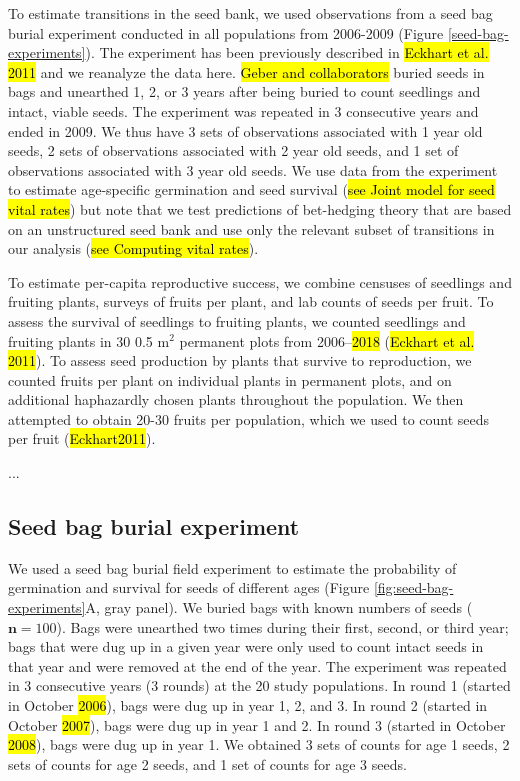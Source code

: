 \documentclass[12pt, oneside, titlepage]{article}   	%
\begin{document}
To estimate transitions in the seed bank, we used observations from a seed bag burial experiment conducted in all populations from 2006-2009 (Figure \ref{seed-bag-experiments}). The experiment has been previously described in \hl{Eckhart et al. 2011} and we reanalyze the data here. \hl{Geber and collaborators} buried seeds in bags and unearthed 1, 2, or 3 years after being buried to count seedlings and intact, viable seeds. The experiment was repeated in 3 consecutive years and ended in 2009. We thus have 3 sets of observations associated with 1 year old seeds, 2 sets of observations associated with 2 year old seeds, and 1 set of observations associated with 3 year old seeds. We use data from the experiment to estimate age-specific germination and seed survival (\hl{see Joint model for seed vital rates}) but note that we test predictions of bet-hedging theory that are based on an unstructured seed bank and use only the relevant subset of transitions in our analysis (\hl{see Computing vital rates}).

To estimate per-capita reproductive success, we combine censuses of seedlings and fruiting plants, surveys of fruits per plant, and lab counts of seeds per fruit. To assess the survival of seedlings to fruiting plants, we counted seedlings and fruiting plants in 30 0.5 m$^2$ permanent plots from 2006--\hl{2018} (\hl{Eckhart et al. 2011}). To assess seed production by plants that survive to reproduction, we counted fruits per plant on individual plants in permanent plots, and on additional haphazardly chosen plants throughout the population. We then attempted to obtain 20-30 fruits per population, which we used to count seeds per fruit (\hl{Eckhart2011}). 

\begin{singlespace*}...
 \label{tab:datasets} 
\begin{center}

\end{center}
\end{singlespace*}

\subsection{Seed bag burial experiment}

We used a seed bag burial field experiment to estimate the probability of germination and survival for seeds of different ages (Figure \ref{fig:seed-bag-experiments}A, gray panel). We buried bags with known numbers of seeds ($\bm{n}=100$). Bags were unearthed two times during their first, second, or third year; bags that were dug up in a given year were only used to count intact seeds in that year and were removed at the end of the year. The experiment was repeated in 3 consecutive years (3 rounds) at the 20 study populations. In round 1 (started in October \hl{2006}), bags were dug up in year 1, 2, and 3. In round 2 (started in October \hl{2007}), bags were dug up in year 1 and 2. In round 3 (started in October \hl{2008}), bags were dug up in year 1. We obtained 3 sets of counts for age 1 seeds, 2 sets of counts for age 2 seeds, and 1 set of counts for age 3 seeds. 
\end{document}

